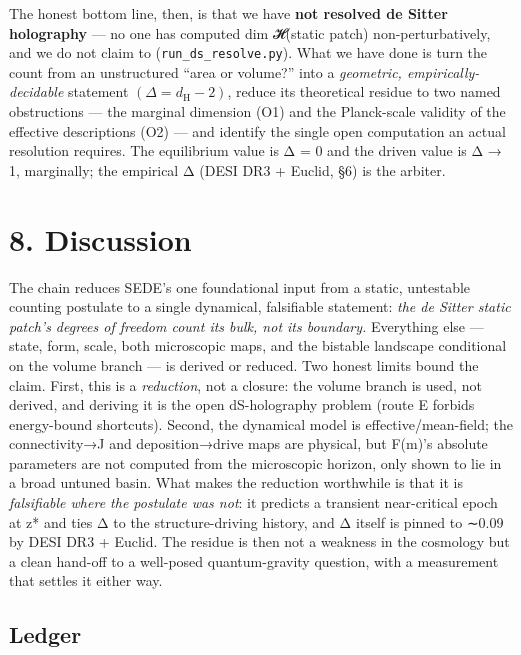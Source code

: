 \documentclass[
  10pt,
]{article}
\begin{document}
The honest bottom line, then, is that we have \textbf{not resolved de
Sitter holography} --- no one has computed dim 𝓗(static patch)
non-perturbatively, and we do not claim to
(\texttt{run\_ds\_resolve.py}). What we have done is turn the count from
an unstructured ``area or volume?'' into a \emph{geometric,
empirically-decidable} statement \((\Delta  = d_{\mathrm{H}} - 2)\),
reduce its theoretical residue to two named obstructions --- the
marginal dimension (O1) and the Planck-scale validity of the effective
descriptions (O2) --- and identify the single open computation an actual
resolution requires. The equilibrium value is Δ = 0 and the driven value
is Δ → 1, marginally; the empirical Δ (DESI DR3 + Euclid, §6) is the
arbiter.

\section{8. Discussion}\label{discussion}

The chain reduces SEDE's one foundational input from a static,
untestable counting postulate to a single dynamical, falsifiable
statement: \emph{the de Sitter static patch's degrees of freedom count
its bulk, not its boundary.} Everything else --- state, form, scale,
both microscopic maps, and the bistable landscape conditional on the
volume branch --- is derived or reduced. Two honest limits bound the
claim. First, this is a \emph{reduction}, not a closure: the volume
branch is used, not derived, and deriving it is the open dS-holography
problem (route E forbids energy-bound shortcuts). Second, the dynamical
model is effective/mean-field; the connectivity→J and deposition→drive
maps are physical, but F(m)'s absolute parameters are not computed from
the microscopic horizon, only shown to lie in a broad untuned basin.
What makes the reduction worthwhile is that it is \emph{falsifiable
where the postulate was not}: it predicts a transient near-critical
epoch at z* and ties Δ to the structure-driving history, and Δ itself is
pinned to ∼0.09 by DESI DR3 + Euclid. The residue is then not a weakness
in the cosmology but a clean hand-off to a well-posed quantum-gravity
question, with a measurement that settles it either way.

\subsection{Ledger}\label{ledger}
\end{document}

